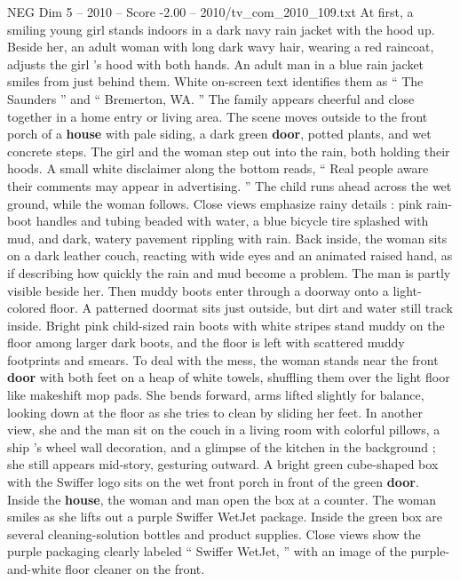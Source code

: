 \begin{textsample}{NEG Dim 5 – 2010 – Score -2.00 – 2010/tv\_com\_2010\_109.txt}  \label{ex:f5_neg_058}
At first, a smiling young girl stands indoors in a dark navy rain jacket with the hood up.
Beside her, an adult woman with long dark wavy hair, wearing a red raincoat, adjusts the girl ’s hood with both hands.
An adult man in a blue rain jacket smiles from just behind them.
White on-screen text identifies them as “ The Saunders ” and “ Bremerton, WA. ” The family appears cheerful and close together in a home entry or living area.
The scene moves outside to the front porch of a \textbf{house} with pale siding, a dark green \textbf{door}, potted plants, and wet concrete steps.
The girl and the woman step out into the rain, both holding their hoods.
A small white disclaimer along the bottom reads, “ Real people aware their comments may appear in advertising. ” The child runs ahead across the wet ground, while the woman follows.
Close views emphasize rainy details : pink rain-boot handles and tubing beaded with water, a blue bicycle tire splashed with mud, and dark, watery pavement rippling with rain.
Back inside, the woman sits on a dark leather couch, reacting with wide eyes and an animated raised hand, as if describing how quickly the rain and mud become a problem.
The man is partly visible beside her.
Then muddy boots enter through a doorway onto a light-colored floor.
A patterned doormat sits just outside, but dirt and water still track inside.
Bright pink child-sized rain boots with white stripes stand muddy on the floor among larger dark boots, and the floor is left with scattered muddy footprints and smears.
To deal with the mess, the woman stands near the front \textbf{door} with both feet on a heap of white towels, shuffling them over the light floor like makeshift mop pads.
She bends forward, arms lifted slightly for balance, looking down at the floor as she tries to clean by sliding her feet.
In another view, she and the man sit on the couch in a living room with colorful pillows, a ship ’s wheel wall decoration, and a glimpse of the kitchen in the background ; she still appears mid-story, gesturing outward.
A bright green cube-shaped box with the Swiffer logo sits on the wet front porch in front of the green \textbf{door}.
Inside the \textbf{house}, the woman and man open the box at a counter.
The woman smiles as she lifts out a purple Swiffer WetJet package.
Inside the green box are several cleaning-solution bottles and product supplies.
Close views show the purple packaging clearly labeled “ Swiffer WetJet, ” with an image of the purple-and-white floor cleaner on the front.

\end{textsample}
